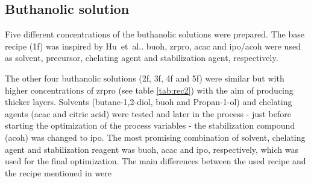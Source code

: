 \subsection{Buthanolic solution}\label{sec:exp-sol-bu}
Five different concentrations of the buthanolic solutions were prepared.
The base recipe (\gls{1f}) was inspired by Hu~et~al.\cite{Hu2016}.
\Gls{buoh}, \gls{zrpro}, \gls{acac} and \gls{ipo}/\gls{acoh} were used as solvent, precursor, chelating agent and stabilization agent, respectively.

The other four buthanolic solutions (\gls{2f}, \gls{3f}, \gls{4f} and \gls{5f}) were similar 
but with higher concentrations of \gls{zrpro} (see table \ref{tab:rec2})
with the aim of producing thicker layers.
Solvents (butane-1,2-diol, \gls{buoh} and Propan-1-ol) and chelating agents 
(\gls{acac} and citric acid) were tested and later in the process - just before 
starting the optimization of the process variables
- the stabilization compound (\gls{acoh}) was changed to \gls{ipo}.
The most promising combination of solvent, chelating agent and stabilization reagent was 
\gls{buoh}, \gls{acac} and \gls{ipo}, respectively, which was used for the final optimization.
The main differences between the used recipe and the recipe mentioned in \cite{Hu2016} were 

